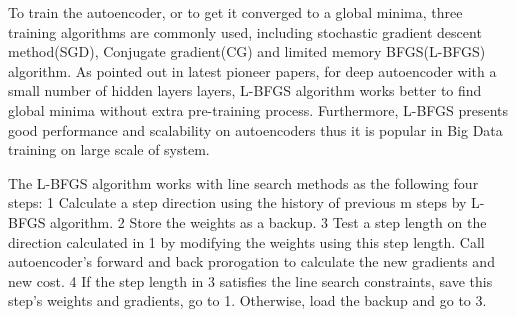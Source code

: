 \documentclass{article}
\begin{document}
To train the autoencoder, or to get it converged to a global minima, three training algorithms are commonly used, including stochastic gradient descent method(SGD), Conjugate gradient(CG) and limited memory BFGS(L-BFGS) algorithm.
As pointed out in latest pioneer papers\cite{Hinton2006,LBFGS}, for deep autoencoder with a small number of hidden layers layers, L-BFGS algorithm works better to find global minima without extra pre-training process.
Furthermore, L-BFGS presents good performance and scalability on autoencoders thus it is popular in Big Data training on large scale of system\cite{QuocLe2011,ngICML2013,}.

The L-BFGS algorithm works with line search methods as the following four steps:
1 Calculate a step direction using the history of previous m steps by L-BFGS algorithm.
2 Store the weights as a backup.
3 Test a step length on the direction calculated in 1 by modifying the weights using this step length. Call autoencoder's forward and back prorogation to calculate the new gradients and new cost.
4 If the step length in 3 satisfies the line search constraints, save this step's weights and gradients, go to 1. Otherwise, load the backup and go to 3.
\end{document}
